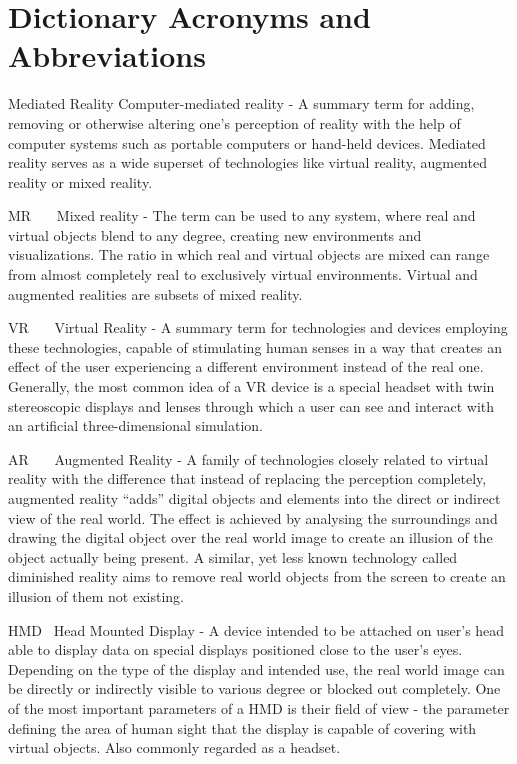 \documentclass[12pt, a4paper]{article}
\newcommand{\specialsection}[1]
{
	\section*{#1}
	\addcontentsline{toc}{section}{\protect\numberline{}#1}
}
\newenvironment{definitions}
{\begin{description}[style=nextline]}
{\end{description}}
\begin{document}

\tableofcontents


\newpage

\setcounter{page}{4}

\specialsection{Dictionary Acronyms and Abbreviations}

\begin{definitions}
	\item[Mediated Reality] Computer-mediated reality - A summary term for adding, removing or otherwise altering one’s perception of reality with the help of computer systems such as portable computers or hand-held devices. Mediated reality serves as a wide superset of technologies like virtual reality, augmented reality or mixed reality.
	\item[MR~~~] Mixed reality - The term can be used to any system, where real and virtual objects blend to any degree, creating new environments and visualizations. The ratio in which real and virtual objects are mixed can range from almost completely real to exclusively virtual environments. Virtual and augmented realities are subsets of mixed reality.
	\item[VR~~~] Virtual Reality - A summary term for technologies and devices employing these technologies, capable of stimulating human senses in a way that creates an effect of the user experiencing a different environment instead of the real one. Generally, the most common idea of a VR device is a special headset with twin stereoscopic displays and lenses through which a user can see and interact with an artificial three-dimensional simulation.
	\item[AR~~~] Augmented Reality - A family of technologies closely related to virtual reality with the difference that instead of replacing the perception completely, augmented reality “adds” digital objects and elements into the direct or indirect view of the real world. The effect is achieved by analysing the surroundings and drawing the digital object over the real world image to create an illusion of the object actually being present. A similar, yet less known technology called diminished reality aims to remove real world objects from the screen to create an illusion of them not existing.
	\item[HMD~] Head Mounted Display - A device intended to be attached on user’s head able to display data on special displays positioned close to the user’s eyes. Depending on the type of the display and intended use, the real world image can be directly or indirectly visible to various degree or blocked out completely. One of the most important parameters of a HMD is their field of view - the parameter defining the area of human sight that the display is capable of covering with virtual objects. Also commonly regarded as a headset.

\end{definitions}
\end{document}
